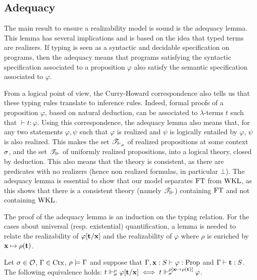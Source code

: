 \documentclass[a4paper,UKenglish,cleveref, autoref, thm-restate]{lipics-v2021}
\begin{document}
\subsection{Adequacy}
\label{}

The main result to ensure a realizability model is sound is the adequacy lemma. This lemma has several implications and is based on the idea that typed terms are realizers. If typing is seen as a syntactic and decidable specification on programs, then the adequacy means that programs satisfying the syntactic specification associated to a proposition $\varphi$ also satisfy the semantic specification associated to $\varphi$.

From a logical point of view, the Curry-Howard correspondence also tells us that these typing rules translate to inference rules. Indeed, formal proofs of a proposition $\varphi$, based on natural deduction, can be associated to $\lambda$-terms $t$ such that $\vdash t : \varphi$. Using this correspondence, the adequacy lemma also means that, for any two statements $\varphi,\psi$ such that $\varphi$ is realized and $\psi$ is logically entailed by $\varphi$, $\psi$ is also realized. This makes the set $\mathscr T_{\Vdash_{\sigma}^{}}$ of realized propositions at some context $\sigma$, and the set $\mathscr T_{\Vvdash}$ of uniformly realized propositions, into a logical theory, closed by deduction. This also means that the theory is consistent, as there are predicates with no realizers (hence non realized formulas, in particular $\bot$). The adequacy lemma is essential to show that our model separates $\mathrm{FT}$ from $\mathrm{WKL}$, as this shows that there is a consistent theory (namely $\mathscr T_{\Vvdash}$) containing $\mathrm{FT}$ and not containing $\mathrm{WKL}$.

The proof of the adequacy lemma is an induction on the typing relation. For the cases about universal (resp. existential) quantification, a lemma is needed to relate the realizability of $\varphi[\mathbf{t}/\mathbf{x}]$ and the realizability of $\varphi$ where $\rho$ is enriched by $\mathbf{x}\mapsto \rho(\mathbf{t})$.

\begin{lemma}
  Let $\sigma \in \mathcal O$, $\Gamma \in \mathrm{Ctx}$, $\rho \models \Gamma$ and suppose that $\Gamma, \mathbf{x} : S \vdash \varphi : \mathrm{Prop}$ and $\Gamma\vdash \mathbf{t} : S$. The following equivalence holds:
  $t \Vdash_{\sigma}^{\rho} \varphi[\mathbf{t}/\mathbf{x}] \iff t \Vdash_{\sigma}^{\rho[\mathbf{x}\mapsto \rho(\mathbf{t})]}\varphi$.
\end{lemma}

\end{document}
